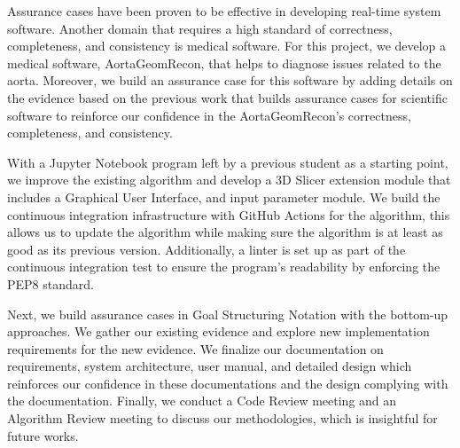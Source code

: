 
Assurance cases have been proven to be effective in developing real-time system software. Another domain that requires a high standard of correctness, completeness, and consistency is medical software. For this project, we develop a medical software, AortaGeomRecon, that helps to diagnose issues related to the aorta. Moreover, we build an assurance case for this software by adding details on the evidence based on the previous work that builds assurance cases for scientific software to reinforce our confidence in the AortaGeomRecon's correctness, completeness, and consistency.

With a Jupyter Notebook program left by a previous student as a starting point, we improve the existing algorithm and develop a 3D Slicer extension module that includes a Graphical User Interface, and input parameter module. We build the continuous integration infrastructure with GitHub Actions for the algorithm, this allows us to update the algorithm while making sure the algorithm is at least as good as its previous version. Additionally, a linter is set up as part of the continuous integration test to ensure the program's readability by enforcing the PEP8 standard.

Next, we build assurance cases in Goal Structuring Notation with the bottom-up approaches. We gather our existing evidence and explore new implementation requirements for the new evidence. We finalize our documentation on requirements, system architecture, user manual, and detailed design which reinforces our confidence in these documentations and the design complying with the documentation. Finally, we conduct a Code Review meeting and an Algorithm Review meeting to discuss our methodologies, which is insightful for future works.
